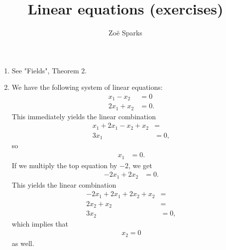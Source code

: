 \documentclass[12pt]{article}
\title{Linear equations (exercises)}
\author{Zoë Sparks}
\begin{document}
\theoremstyle{definition}

\newtheorem{thm}{Theorem}
\newtheorem*{nthm}{Theorem}
\newtheorem{sthm}{}[thm]
\newtheorem{lemma}{Lemma}[thm]
\newtheorem*{cor}{Corollary}
\newtheorem*{prop}{Property}
\newtheorem*{defn}{Definition}

\maketitle

\begin{enumerate}
    \item
      See "Fields", Theorem 2.

    \item
      We have the following system of linear equations:
      \begin{align*}
         x_1 - x_2 &= 0\\
        2x_1 + x_2 &= 0.
      \end{align*}
      This immediately yields the linear combination
      \begin{align*}
        x_1 + 2x_1 - x_2 + x_2 &=\\
        3x_1 &= 0,
      \end{align*}
      so
      \begin{align*}
        x_1 &= 0.
      \end{align*}
      If we multiply the top equation by $-2$, we get
      \begin{align*}
       -2x_1 + 2x_2 &= 0.
      \end{align*}
      This yields the linear combination
      \begin{align*}
        -2x_1 + 2x_1 + 2x_2 + x_2 &=\\
        2x_2 + x_2 &=\\
        3x_2 &= 0,
      \end{align*}
      which implies that
      \begin{align*}
         x_2 = 0
      \end{align*}
      as well.\\


\end{enumerate}
\end{document}
